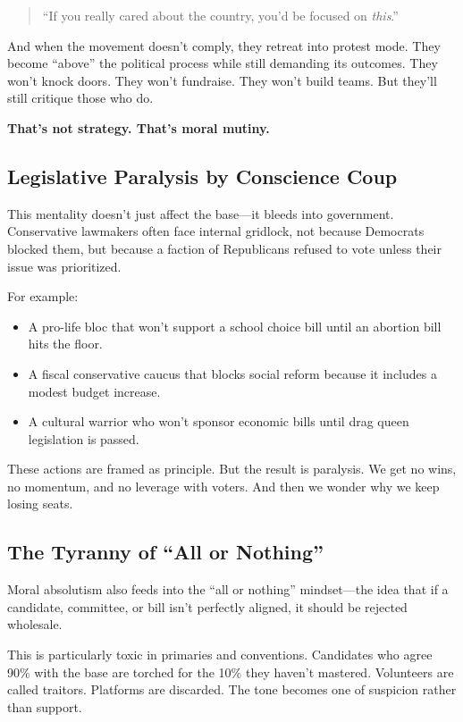 \begin{quote}
    “If you really cared about the country, you’d be focused on \textit{this}.”
\end{quote}

And when the movement doesn’t comply, they retreat into protest mode. They become “above” the political process while still demanding its outcomes. They won’t knock doors. They won’t fundraise. They won’t build teams. But they’ll still critique those who do.

\textbf{That’s not strategy. That’s moral mutiny.}

\subsection*{Legislative Paralysis by Conscience Coup}

This mentality doesn’t just affect the base—it bleeds into government. Conservative lawmakers often face internal gridlock, not because Democrats blocked them, but because a faction of Republicans refused to vote unless their issue was prioritized.

For example:
\begin{itemize}
    \item A pro-life bloc that won’t support a school choice bill until an abortion bill hits the floor.
    \item A fiscal conservative caucus that blocks social reform because it includes a modest budget increase.
    \item A cultural warrior who won’t sponsor economic bills until drag queen legislation is passed.
\end{itemize}

These actions are framed as principle. But the result is paralysis. We get no wins, no momentum, and no leverage with voters. And then we wonder why we keep losing seats.

\subsection*{The Tyranny of “All or Nothing”}

Moral absolutism also feeds into the “all or nothing” mindset—the idea that if a candidate, committee, or bill isn’t perfectly aligned, it should be rejected wholesale.

This is particularly toxic in primaries and conventions. Candidates who agree 90\% with the base are torched for the 10\% they haven’t mastered. Volunteers are called traitors. Platforms are discarded. The tone becomes one of suspicion rather than support.

